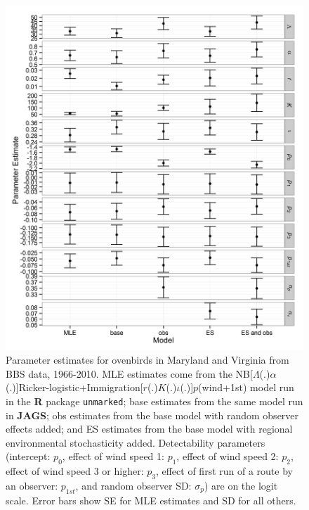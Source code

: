 \documentclass{article}
\begin{document}
\clearpage
\begin{figure}
  \centering
  \includegraphics[width=6.5in]{../figs/oven_par_est}
\caption{Parameter estimates for ovenbirds in Maryland and Virginia from BBS data, 1966-2010.  
MLE estimates come from the NB[$\Lambda$(.)$\alpha$(.)]Ricker-logistic+Immigration[$r$(.)$K$(.)$\iota$(.)]$p$(wind+1st) 
model run in the \textbf{R} package \texttt{unmarked}; base estimates from the same model run in \textbf{JAGS};
obs estimates from the base model with random observer effects added; and ES estimates from the base
model with regional environmental stochasticity added.  Detectability parameters (intercept: $p_{0}$, 
effect of wind speed 1: $p_{1}$, effect of wind speed 2: $p_{2}$, effect of wind speed 3 or higher: $p_{3}$, 
effect of first run of a route by an observer: $p_{1st}$, and random observer SD: $\sigma_{p}$) are on the 
logit scale. Error bars show SE for MLE estimates and SD for all others.}
\label{fig:oven_par_est}
\end{figure}
\end{document}
